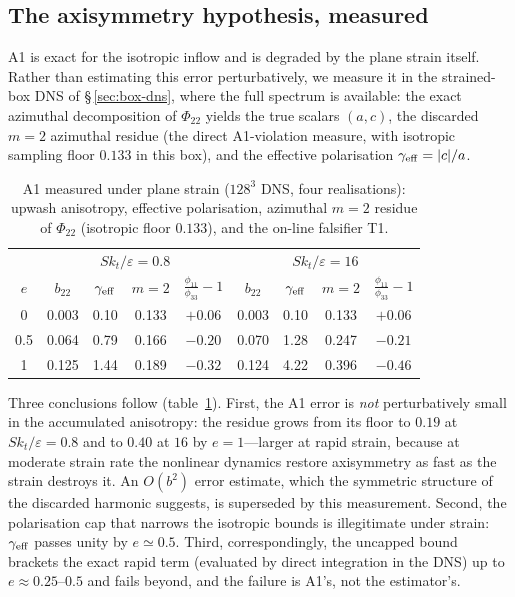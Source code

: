 \documentclass[11pt,a4paper]{article}
\begin{document}
\subsection{The axisymmetry hypothesis, measured}\label{sec:a1meas}

A1 is exact for the isotropic inflow and is degraded by the plane strain
itself. Rather than estimating this error perturbatively, we measure it in
the strained-box DNS of \S\,\ref{sec:box-dns}, where the full spectrum is
available: the exact azimuthal decomposition of $\Phi_{22}$ yields the true
scalars $(a,c)$, the discarded $m=2$ azimuthal residue (the direct
A1-violation measure, with isotropic sampling floor $0.133$ in this box),
and the effective polarisation $\gamma_{\rm eff}=|c|/a$.

\begin{table}
  \centering\small
  \begin{tabular}{c|cccc|cccc}
  & \multicolumn{4}{c|}{$Sk_t/\varepsilon=0.8$} & \multicolumn{4}{c}{$Sk_t/\varepsilon=16$}\\
  $e$ & $b_{22}$ & $\gamma_{\rm eff}$ & $m{=}2$ & $\tfrac{\phi_{11}}{\phi_{33}}{-}1$
      & $b_{22}$ & $\gamma_{\rm eff}$ & $m{=}2$ & $\tfrac{\phi_{11}}{\phi_{33}}{-}1$\\[1pt]
  0    & 0.003 & 0.10 & 0.133 & $+0.06$ & 0.003 & 0.10 & 0.133 & $+0.06$\\
  0.5  & 0.064 & 0.79 & 0.166 & $-0.20$ & 0.070 & 1.28 & 0.247 & $-0.21$\\
  1    & 0.125 & 1.44 & 0.189 & $-0.32$ & 0.124 & 4.22 & 0.396 & $-0.46$\\
  \end{tabular}
  \caption{A1 measured under plane strain ($128^3$ DNS, four realisations):
  upwash anisotropy, effective polarisation, azimuthal $m=2$ residue of
  $\Phi_{22}$ (isotropic floor $0.133$), and the on-line falsifier T1.}
  \label{tab:a1meas}
\end{table}

Three conclusions follow (table~\ref{tab:a1meas}). First, the A1 error is
\emph{not} perturbatively small in the accumulated anisotropy: the residue
grows from its floor to $0.19$ at $Sk_t/\varepsilon=0.8$ and to $0.40$ at
$16$ by $e=1$---larger at rapid strain, because at moderate strain rate the
nonlinear dynamics restore axisymmetry as fast as the strain destroys it.
An $O(b^2)$ error estimate, which the symmetric structure of the discarded
harmonic suggests, is superseded by this measurement. Second, the
polarisation cap that narrows the isotropic bounds is illegitimate under
strain: $\gamma_{\rm eff}$ passes unity by $e\simeq0.5$. Third,
correspondingly, the uncapped bound brackets the exact rapid term
(evaluated by direct integration in the DNS) up to $e\approx0.25$--$0.5$
and fails beyond, and the failure is A1's, not the estimator's.
\end{document}
